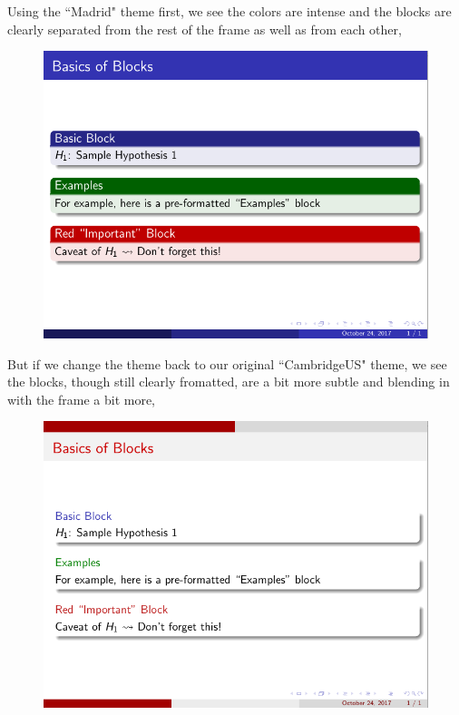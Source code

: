 \documentclass[11pt]{article}
\begin{document}
Using the ``Madrid" theme first, we see the colors are intense and the blocks are clearly separated from the rest of the frame as well as from each other,

\begin{figure}[!h]
	\includegraphics[scale=.5]{OUT61}
	\centering
\end{figure}

\newpage

But if we change the theme back to our original ``CambridgeUS" theme, we see the blocks, though still clearly fromatted, are a bit more subtle and blending in with the frame a bit more,

\begin{figure}[!h]
	\includegraphics[scale=.5]{OUT62}
	\centering
\end{figure}
\end{document}

